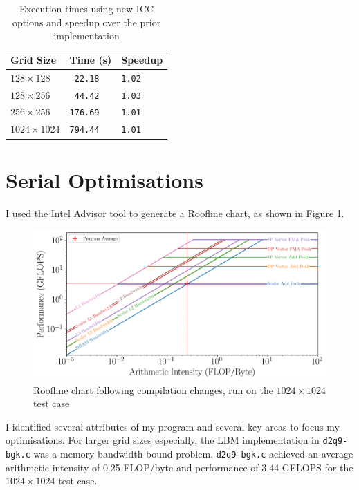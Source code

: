 \documentclass[twocolumn, a4paper]{article}
\begin{document}
\begin{table}[htbp]
  \begin{center}
  \caption{Execution times using new ICC options and speedup over the prior implementation}\label{tab:compiler_options}
  \begin{tabular}[t]{l | l l} 
      \hline\hline
      Grid Size&Time (s)&Speedup\\
      \hline
      $128 \times 128$&\texttt{ 22.18}&\texttt{1.02}\\
      $128 \times 256$&\texttt{ 44.42}&\texttt{1.03}\\
      $256 \times 256$&\texttt{176.69}&\texttt{1.01}\\
      $1024 \times 1024$&\texttt{794.44}&\texttt{1.01}\\
      \hline
    \end{tabular}
  \end{center}
\end{table}

\section{Serial Optimisations}

I used the Intel Advisor tool to generate a Roofline chart, as shown in Figure \ref{fig:roofline_compiler}.

\begin{figure}[htbp]
\includegraphics[width=\linewidth]{roofline_compiler.png}
\caption{Roofline chart following compilation changes, run on the $1024\times1024$ test case}\label{fig:roofline_compiler}
\end{figure}

I identified several attributes of my program and several key areas to focus my optimisations.
For larger grid sizes especially, the LBM implementation in \texttt{d2q9-bgk.c} was a memory bandwidth bound problem.
\texttt{d2q9-bgk.c} achieved an average arithmetic intensity of 0.25 FLOP/byte and performance of 3.44 GFLOPS for the $1024 \times 1024$ test case.
\end{document}
